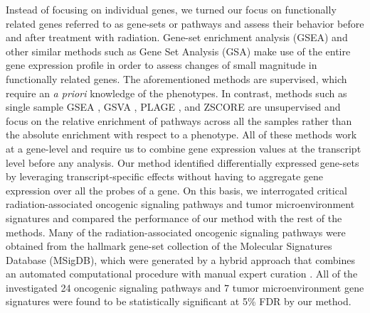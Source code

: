 \documentclass[hidelinks,11pt]{article}
\begin{document}
Instead of focusing on individual genes, we turned our focus on functionally related genes referred to as gene-sets or pathways and assess their behavior before and after treatment with radiation. Gene-set enrichment analysis (GSEA) and other similar methods such as Gene Set Analysis (GSA) make use of the entire gene expression profile in order to assess changes of small magnitude in functionally related genes. The aforementioned methods are supervised, which require an \emph{a priori} knowledge of the phenotypes. In contrast, methods such as single sample GSEA \cite{ssgsea}, GSVA \cite{gsva}, PLAGE \cite{plage}, and ZSCORE \cite{zscore} are unsupervised and focus on the relative enrichment of pathways across all the samples rather than the absolute enrichment with respect to a phenotype. All of these methods work at a gene-level and require us to combine gene expression values at the transcript level before any analysis. Our method identified differentially expressed gene-sets by leveraging transcript-specific effects without having to aggregate gene expression over all the probes of a gene. On this basis, we interrogated critical radiation-associated oncogenic signaling pathways and tumor microenvironment signatures and compared the performance of our method with the rest of the methods. Many of the radiation-associated oncogenic signaling pathways were obtained from the hallmark gene-set collection of the Molecular Signatures Database (MSigDB), which were generated by a hybrid approach that combines an automated computational procedure with manual expert curation \cite{msigdb_hm}. All of the investigated 24 oncogenic signaling pathways and 7 tumor microenvironment gene signatures were found to be statistically significant at 5\% FDR by our method. 
\end{document}
